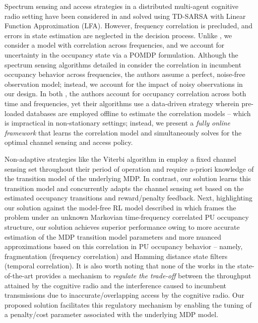\documentclass[10pt,twocolumn]{IEEEtran}
\begin{document}
Spectrum sensing and access strategies in a distributed multi-agent cognitive radio setting have been considered in \cite{6507570} and solved using TD-SARSA with Linear Function Approximation (LFA). However, frequency correlation is precluded, and errors in state estimation are neglected in the decision process. Unlike \cite{6507570}, we consider a model with correlation across frequencies, and we account for uncertainty in the occupancy state via a POMDP formulation. Although the spectrum sensing algorithms detailed in \cite{6956794} consider the correlation in incumbent occupancy behavior across frequencies, the authors assume a perfect, noise-free observation model; instead, we account for the impact of noisy observations in our design. In both \cite{6956794, 4554696}, the authors account for occupancy correlation across both time and frequencies, yet their algorithms use a data-driven strategy wherein pre-loaded databases are employed offline to estimate the correlation models -- which is impractical in non-stationary settings; instead, we present a \emph{fully online framework} that learns the correlation model and simultaneously solves for the optimal channel sensing and access policy. 

Non-adaptive strategies like the Viterbi algorithm in \cite{4554696} employ a fixed channel sensing set throughout their period of operation and  require a-priori knowledge of the transition model of the underlying MDP. In contrast, our solution learns this transition model and concurrently adapts the channel sensing set based on the estimated occupancy transitions and reward/penalty feedback. Next, highlighting our solution against the model-free RL model described in \cite{DQN} which frames the problem under an unknown Markovian time-frequency correlated PU occupancy structure, our solution achieves superior performance owing to more accurate estimation of the MDP transition model parameters and more nuanced approximations based on this correlation in PU occupancy behavior -- namely, fragmentation (frequency correlation) and Hamming distance state filters (temporal correlation). It is also worth noting that none of the works in the state-of-the-art provides a mechanism to \emph{regulate the trade-off} between the throughput attained by the cognitive radio and the interference caused to incumbent transmissions due to inaccurate/overlapping access by the cognitive radio. Our proposed solution facilitates this regulatory mechanism by enabling the tuning of a penalty/cost parameter associated with the underlying MDP model. 
\end{document}

